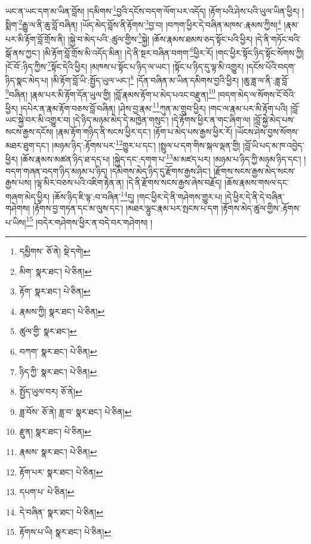 ཡང་ན་ཡང་དག་མ་ཡིན་བློས། །དམིགས་\footnote{དམྱིགས་  ཅོ་ནེ།  སྡེ་དགེ། }བྱའི་དངོས་བདག་ལོག་པར་འདོད། །རྟོག་པའི་ཤེས་པའི་ཡུལ་ཡིན་ཕྱིར། །སྨིག་\footnote{མིག་  སྣར་ཐང་།  པེ་ཅིན། }རྒྱུ་ལ་ནི་ཆུ་བློ་བཞིན། །ཡོད་མེད་བློས་ནི་རྟོགས་\footnote{རྟོག་  སྣར་ཐང་།  པེ་ཅིན། }བྱ་བ། །བཀག་ཕྱིར་དེ་བཞིན་མཁས་:རྣམས་ཀྱིས།\footnote{རྣམས་ཀྱི།  སྣར་ཐང་།  པེ་ཅིན། } །རྣམ་པར་མི་རྟོག་བློ་གྲོས་ནི། །སྐྱེ་བ་མེད་པའི་:ཚུལ་གྱིས་\footnote{ཚུལ་གྱི་  སྣར་ཐང་། }སྐྱེ། །ཆོས་རྣམས་ཐམས་ཅད་སྟོང་པའི་ཕྱིར། །དེ་ནི་གཏོང་བའི་སྒོ་ནས་ཀྱང་། །མི་རྟོག་བློ་གྲོས་མི་འདོད་མིན། །དེ་ནི་སྔར་བཞིན་བགག་\footnote{བཀག་  སྣར་ཐང་།  པེ་ཅིན། }ཕྱིར་རོ། །གང་ཕྱིར་སྟོང་ཉིད་སྟོང་སོགས་ཀྱི། །ངོ་བོ་:ཉིད་ཀྱིས་\footnote{ཉིད་ཀྱི་  སྣར་ཐང་།  པེ་ཅིན། }སྟོང་དེའི་ཕྱིར། །མཁས་པ་སྟོང་པ་ཉིད་ལ་ཡང་། །སྟོང་པ་ཉིད་དུ་ལྟ་མི་འགྱུར། །དངོས་པོའི་བདག་ཉིད་སྣང་མེད་པ། །མི་རྟོག་བློ་ཡི་:སྤྱོད་ཡུལ་ཡང་།\footnote{སྤྱོད་ཡུལ་བར།  ཅོ་ནེ། } །དོན་བཞིན་མ་ཡིན་དམིགས་བྱའི་ཕྱིར། །ཆུ་ཟླ་ལ་ནི་:ཟླ་བློ་\footnote{ཟླ་བོས་  ཅོ་ནེ། ཟླ་བ་  སྣར་ཐང་།  པེ་ཅིན། }བཞིན། །རྣམ་པར་མི་རྟོག་དོན་ཡུལ་གྱི། །བློ་རྣམས་རྟོག་པ་མེད་པའང་བརྫུན།\footnote{རྫུན།  སྣར་ཐང་།  པེ་ཅིན། } །བདག་མེད་ལ་སོགས་ངོ་བོའི་ཕྱིར། །དཔེར་ན་རྣམ་རྟོག་བཅས་བློ་བཞིན། །ཤེས་བྱ་རྣམ་\footnote{རྣམས་  སྣར་ཐང་།  པེ་ཅིན། }ཀུན་མ་གྲུབ་ཕྱིར། །གང་ལ་རྣམ་པར་མི་རྟོག་པའི། །བློ་ཡང་སྐྱེ་བར་མི་འགྱུར་བ། །དེ་ཉིད་མཉམ་མེད་དེ་མཁྱེན་གསུང་། །དེ་རྟོགས་ཕྱིར་ན་གང་ཞིག་ལ། །བློ་སྐྱེ་མེད་པས་སངས་རྒྱས་དངོས། །རྣམ་རྟོག་གཉིད་ནི་སངས་ཕྱིར་དང་། །རྟོག་པ་མེད་པས་རྒྱས་ཕྱིར་རོ། །ཡོངས་ཤེས་བྱས་སོགས་མཐར་ཐུག་དང་། །མཉམ་ཉིད་:རྟོགས་པར་\footnote{རྟོག་པར་  སྣར་ཐང་།  པེ་ཅིན། }གྱུར་པ་དང་། །སྤྲུལ་པ་དག་གིས་སྐལ་ལྡན་གྱི། །བློ་ཡི་པད་མ་ཁ་འབྱེད་ཕྱིར། །ཆོས་རྣམས་མཚན་ཉིད་ཐ་དད་པ། །སྐྱེད་དང་:དགག་པ་\footnote{དཔག་པ་  པེ་ཅིན། }མ་མཛད་པར། །མཉམ་པ་ཉིད་ཀྱི་མཉམ་ཉིད་དང་། །བདག་གཞན་བདག་ཉིད་མཉམ་པ་ཉིད། །དམིགས་མེད་ཉིད་དུ་རྫོགས་རྒྱས་ཤིང་། །རྫོགས་སངས་རྒྱས་མེད་སངས་རྒྱས་པས། །ལྷ་མིར་བཅས་པའི་འཇིག་རྟེན་ན། །དེ་ནི་རྫོགས་སངས་རྒྱས་ཞེས་བརྗོད། །ཆོས་རྣམས་གསལ་དང་གཞག་མེད་ཕྱིར། །ཆོས་ཉིད་ཇི་ལྟ་:བ་བཞིན་\footnote{དེ་བཞིན་  སྣར་ཐང་།  པེ་ཅིན། }དུ། །གང་ཕྱིར་དེ་ནི་གཤེགས་གྱུར་པ། །དེ་ཕྱིར་དེ་ནི་དེ་བཞིན་གཤེགས། །རྟོགས་བྱ་གཏན་དང་མ་ལུས་དང་། །མཐར་ལྷུང་རྣམ་པར་སྤངས་པ་དག །རྟོགས་མེད་ཚུལ་གྱིས་:རྟོགས་པ་ཡིས།\footnote{རྟོགས་པ་ཡི།  སྣར་ཐང་།  པེ་ཅིན། } །བདེར་གཤེགས་ཕྱིར་ན་བདེ་བར་གཤེགས། །
